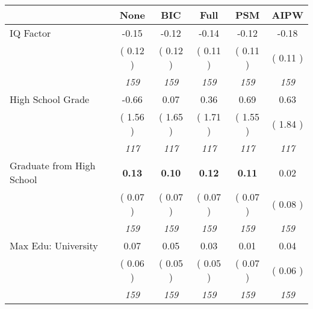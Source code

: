\begin{tabular}{l c c c c c}
\toprule
 & None & BIC & Full & PSM & AIPW \\
\midrule
IQ Factor &     -0.15 &     -0.12 &     -0.14 &     -0.12 &     -0.18 \\
& (     0.12 ) & (     0.12 ) & (     0.11 ) & (     0.11 ) & (     0.11 ) \\
& \textit{ 159 } & \textit{ 159 } & \textit{ 159 } & \textit{ 159 } & \textit{ 159 } \\
High School Grade &     -0.66 &      0.07 &      0.36 &      0.69 &      0.63 \\
& (     1.56 ) & (     1.65 ) & (     1.71 ) & (     1.55 ) & (     1.84 ) \\
& \textit{ 117 } & \textit{ 117 } & \textit{ 117 } & \textit{ 117 } & \textit{ 117 } \\
Graduate from High School & \textbf{      0.13 } & \textbf{      0.10 } & \textbf{      0.12 } & \textbf{     0.11} &      0.02 \\
& (     0.07 ) & (     0.07 ) & (     0.07 ) & (     0.07 ) & (     0.08 ) \\
& \textit{ 159 } & \textit{ 159 } & \textit{ 159 } & \textit{ 159 } & \textit{ 159 } \\
Max Edu: University &      0.07 &      0.05 &      0.03 &      0.01 &      0.04 \\
& (     0.06 ) & (     0.05 ) & (     0.05 ) & (     0.07 ) & (     0.06 ) \\
& \textit{ 159 } & \textit{ 159 } & \textit{ 159 } & \textit{ 159 } & \textit{ 159 } \\
\bottomrule
\end{tabular}
